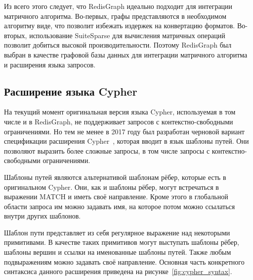 Из всего этого следует, что RedisGraph идеально подходит для интеграции матричного алгоритма. Во-первых, графы представляются в необходимом алгоритму виде, что позволит избежать издержек на конвертацию форматов. Во-вторых, использование SuiteSparse для вычисления матричных операций позволит добиться высокой производительности. Поэтому RedisGraph был выбран в качестве графовой базы данных для интеграции матричного алгоритма и расширения языка запросов.


\subsection{Расширение языка Cypher}\label{subsection:cypher-extention}
На текущий момент оригинальная версия языка Cypher, используемая в том числе и в RedisGraph, не поддерживает запросов с контекстно-свободными ограничениями. Но тем не менее в 2017 году был разработан черновой вариант спецификации расширения Cypher~\cite{cypher-specification}, которая вводит в язык шаблоны путей. Они позволяют выразить более сложные запросы, в том числе запросы с контекстно-свободными ограничениями.

Шаблоны путей являются альтернативой шаблонам рёбер, которые есть в оригинальном Cypher. Они, как и шаблоны рёбер, могут встречаться в выражении MATCH и иметь своё направление. Кроме этого в глобальной области запроса им можно задавать имя, на которое потом можно ссылаться внутри других шаблонов.

Шаблон пути представляет из себя регулярное выражение над некоторыми примитивами. В качестве таких примитивов могут выступать шаблоны рёбер, шаблоны вершин и ссылки на именованные шаблоны путей. Также любым подвыражениям можно задавать своё направление. Основная часть конкретного синтаксиса данного расширения приведена на рисунке~\ref{fig:cypher_syntax}.

